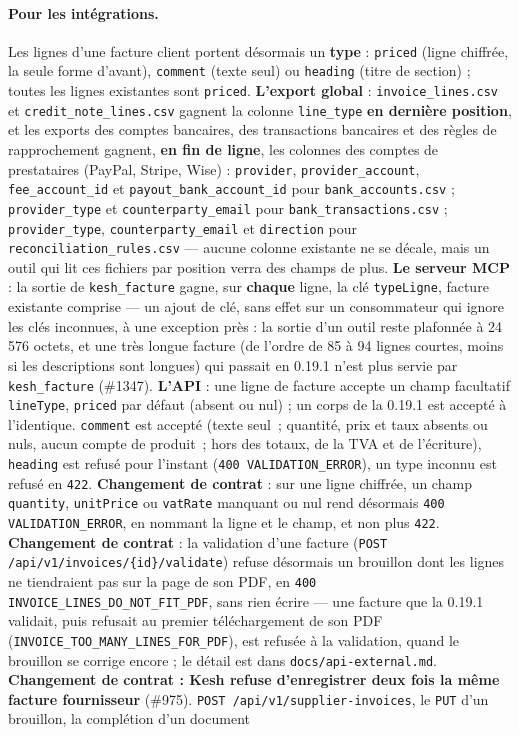 \documentclass[a4paper,11pt,oneside]{article}
\begin{document}
\begin{sloppypar}
\paragraph{Pour les intégrations.} Les lignes d'une facture client portent désormais un \textbf{type} : \texttt{priced} (ligne chiffrée, la seule forme d'avant), \texttt{comment} (texte seul) ou \texttt{heading} (titre de section) ; toutes les lignes existantes sont \texttt{priced}. \textbf{L'export global} : \texttt{invoice\_lines.csv} et \texttt{credit\_note\_lines.csv} gagnent la colonne \texttt{line\_type} \textbf{en dernière position}, et les exports des comptes bancaires, des transactions bancaires et des règles de rapprochement gagnent, \textbf{en fin de ligne}, les colonnes des comptes de prestataires (PayPal, Stripe, Wise) : \texttt{provider}, \texttt{provider\_account}, \texttt{fee\_account\_id} et \texttt{payout\_bank\_account\_id} pour \texttt{bank\_accounts.csv} ; \texttt{provider\_type} et \texttt{counterparty\_email} pour \texttt{bank\_transactions.csv} ; \texttt{provider\_type}, \texttt{counterparty\_email} et \texttt{direction} pour \texttt{reconciliation\_rules.csv} --- aucune colonne existante ne se décale, mais un outil qui lit ces fichiers par position verra des champs de plus. \textbf{Le serveur MCP} : la sortie de \texttt{kesh\_facture} gagne, sur \textbf{chaque} ligne, la clé \texttt{typeLigne}, facture existante comprise --- un ajout de clé, sans effet sur un consommateur qui ignore les clés inconnues, à une exception près : la sortie d'un outil reste plafonnée à 24\,576 octets, et une très longue facture (de l'ordre de 85 à 94 lignes courtes, moins si les descriptions sont longues) qui passait en 0.19.1 n'est plus servie par \texttt{kesh\_facture} (\#1347). \textbf{L'API} : une ligne de facture accepte un champ facultatif \texttt{lineType}, \texttt{priced} par défaut (absent ou nul) ; un corps de la 0.19.1 est accepté à l'identique. \texttt{comment} est accepté (texte seul~; quantité, prix et taux absents ou nuls, aucun compte de produit~; hors des totaux, de la TVA et de l'écriture), \texttt{heading} est refusé pour l'instant (\texttt{400 VALIDATION\_ERROR}), un type inconnu est refusé en \texttt{422}. \textbf{Changement de contrat} : sur une ligne chiffrée, un champ \texttt{quantity}, \texttt{unitPrice} ou \texttt{vatRate} manquant ou nul rend désormais \texttt{400 VALIDATION\_ERROR}, en nommant la ligne et le champ, et non plus \texttt{422}. \textbf{Changement de contrat} : la validation d'une facture (\texttt{POST /api/v1/\allowbreak invoices/\allowbreak\{id\}/\allowbreak validate}) refuse désormais un brouillon dont les lignes ne tiendraient pas sur la page de son PDF, en \texttt{400 INVOICE\_LINES\_DO\_NOT\_FIT\_PDF}, sans rien écrire --- une facture que la 0.19.1 validait, puis refusait au premier téléchargement de son PDF (\texttt{INVOICE\_TOO\_MANY\_LINES\_FOR\_PDF}), est refusée à la validation, quand le brouillon se corrige encore ; le détail est dans \texttt{docs/api-external.md}. \textbf{Changement de contrat : Kesh refuse d'enregistrer deux fois la même facture fournisseur} (\#975). \texttt{POST /api/v1/\allowbreak supplier-invoices}, le \texttt{PUT} d'un brouillon, la complétion d'un document 
\end{sloppypar}
\end{document}

